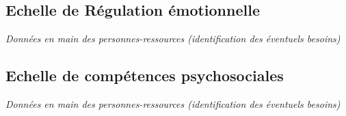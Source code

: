\documentclass[
]{article}
\begin{document}
\hypertarget{echelle-de-ruxe9gulation-uxe9motionnelle}{%
\subsection{Echelle de Régulation émotionnelle}\label{echelle-de-ruxe9gulation-uxe9motionnelle}}

\emph{Données en main des personnes-ressources (identification des éventuels besoins)}

\hypertarget{echelle-de-compuxe9tences-psychosociales}{%
\subsection{Echelle de compétences psychosociales}\label{echelle-de-compuxe9tences-psychosociales}}

\emph{Données en main des personnes-ressources (identification des éventuels besoins)}
\end{document}
